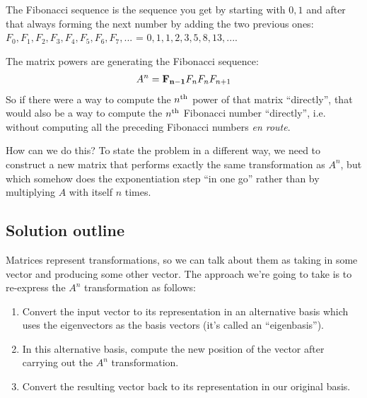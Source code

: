 The Fibonacci sequence is the sequence you get by starting with $0,
1$ and after that always forming the next number by adding the two previous ones:
$F_0, F_1, F_2, F_3, F_4, F_5, F_6, F_7, ...$ = $0, 1, 1, 2, 3, 5, 8, 13, ...$.

The matrix powers are generating the Fibonacci sequence:
\begin{align*}
  A^{n} = \mathbf{F_{n-1} }{F_n      }
  {F_n     }{F_{n+1} }
\end{align*}
So if there were a way to compute the $n^{\text{th}}$ power of that matrix ``directly'',
that would also be a way to compute the $n^{\text{th}}$ Fibonacci number ``directly'',
i.e. without computing all the preceding Fibonacci numbers \textit{en route}.

How can we do this? To state the problem in a different way, we need to
construct a new matrix that performs exactly the same transformation as $A^n$,
but which somehow does the exponentiation step ``in one go'' rather than by
multiplying $A$ with itself $n$ times.

\subsection*{Solution outline}

Matrices represent transformations, so we can talk about them as taking in some
vector and producing some other vector. The approach we're going to take is to
re-express the $A^n$ transformation as follows:

\begin{enumerate}
\item Convert the input vector to its representation in an alternative basis which uses the
  eigenvectors as the basis vectors (it's called an ``eigenbasis'').
\item In this alternative basis, compute the new position of the vector after carrying out the
  $A^n$ transformation.
\item Convert the resulting vector back to its representation in our original basis.
\end{enumerate}

